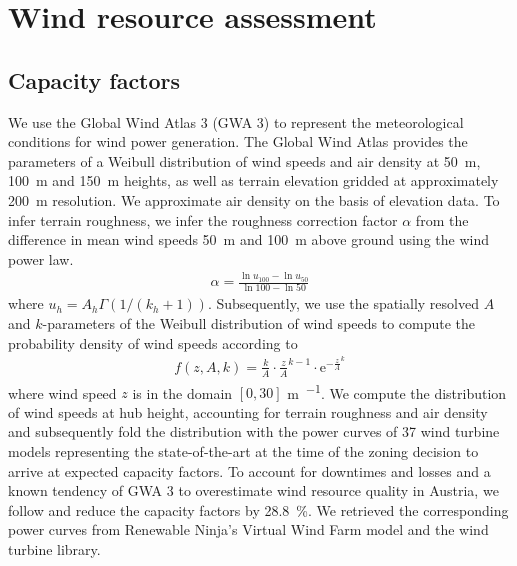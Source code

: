 \documentclass[review, a4paper, 12pt, authoryear, times]{elsarticle}
\begin{document}
\section{Wind resource assessment}\label{app:wind-resource-assessment}

\subsection{Capacity factors} \label{app:capacity-factors}
We use the Global Wind Atlas 3 (GWA 3) \citep{DTU2022} to represent the meteorological conditions for wind power generation. 
The Global Wind Atlas provides the parameters of a Weibull distribution of wind speeds and air density at \SI{50}{\metre}, \SI{100}{\metre} and \SI{150}{\metre} heights, as well as terrain elevation gridded at approximately \SI{200}{\metre} resolution.
We approximate air density on the basis of elevation data.
To infer terrain roughness, we infer the roughness correction factor $\alpha$ from the difference in mean wind speeds \SI{50}{\metre} and \SI{100}{\metre} above ground using the wind power law.
\begin{align}
    \alpha = \frac{\ln{u_{100}} - \ln{u_{50}}}{\ln{100} - \ln{50}}
\end{align}
where $u_h = A_h \Gamma(1/(k_h + 1))$.
Subsequently, we use the spatially resolved $A$ and $k$-parameters of the Weibull distribution of wind speeds to compute the probability density of wind speeds according to
\begin{align}
    f(z,A,k) = \frac{k}{A} \cdot \frac{z}{A}^{k-1} \cdot \mathrm{e}^{-\frac{z}{A}^{k}}
\end{align}
where wind speed $z$ is in the domain $[0, 30]$ \si{\metre \per \sec}.
We compute the distribution of wind speeds at hub height, accounting for terrain roughness and air density and subsequently fold the distribution with the power curves of \num{37} wind  turbine models representing the state-of-the-art at the time of the zoning decision to arrive at expected capacity factors. 
To account for downtimes and losses and a known tendency of GWA 3 to overestimate wind resource quality in Austria, we follow \cite{Wehrle2021} and reduce the capacity factors by \SI{28.8}{\percent}.
We retrieved the corresponding power curves from Renewable Ninja's Virtual Wind Farm model \citep{Staffell2016} and the \cite{oep2019} wind turbine library.
\end{document}
